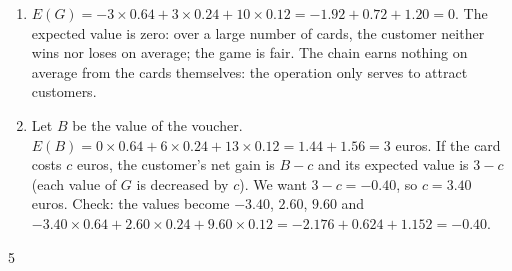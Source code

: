 {\begin{enumerate}
\[\begin{array}{|l|c|c|c|}
\end{array}
\]
Check: $\num{0,64}+\num{0,24}+\num{0,12}=1$.
\item $E(G)=-3\times\num{0,64}+3\times\num{0,24}+10\times\num{0,12}=-\num{1,92}+\num{0,72}+\num{1,20}=0$.
The expected value is zero: over a large number of cards, the customer neither wins nor loses on average; the game is fair. The chain earns nothing on average from the cards themselves: the operation only serves to attract customers.
\item Let $B$ be the value of the voucher. $E(B)=0\times\num{0,64}+6\times\num{0,24}+13\times\num{0,12}=\num{1,44}+\num{1,56}=3$ euros. If the card costs $c$ euros, the customer's net gain is $B-c$ and its expected value is $3-c$ (each value of $G$ is decreased by $c$). We want $3-c=-\num{0,40}$, so $c=\num{3,40}$ euros.
Check: the values become $-\num{3,40}$, $\num{2,60}$, $\num{9,60}$ and $-\num{3,40}\times\num{0,64}+\num{2,60}\times\num{0,24}+\num{9,60}\times\num{0,12}=-\num{2,176}+\num{0,624}+\num{1,152}=-\num{0,40}$.
\end{enumerate}
}{5}

